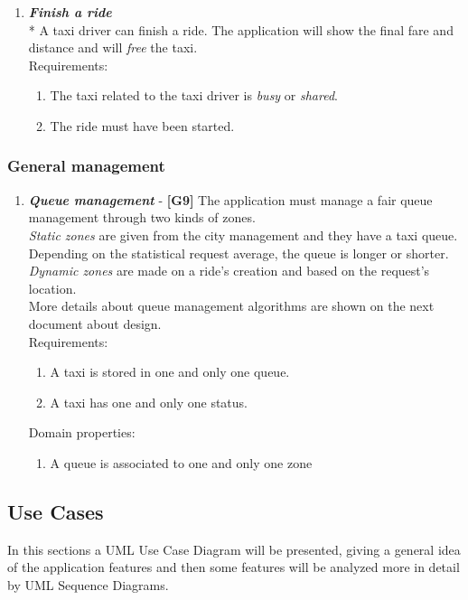\documentclass{article}
\begin{document}
\begin{enumerate}
\item \textit{\textbf{Finish a ride}}\\*
A taxi driver can finish a ride. The application will show the final fare and distance and will \textit{free} the taxi.\\
Requirements:
\begin{enumerate}
\item The taxi related to the taxi driver is \textit{busy} or \textit{shared}.
\item The ride must have been started.
\end{enumerate}

\end{enumerate}

\subsubsection{General management}
\begin{enumerate}
\item \textit{\textbf{Queue management}} - \textbf{[G9]}
The application must manage a fair queue management through two kinds
of zones.\\
\textit{Static zones} are given from the city management and they have a taxi queue. Depending on the statistical request average, the queue is longer or shorter.\\
\textit{Dynamic zones} are made on a ride’s creation and based on the request’s location.\\
More details about queue management algorithms are shown on the next
document about design.\\
Requirements:
\begin{enumerate}
\item A taxi is stored in one and only one queue.
\item A taxi has one and only one status.
\end{enumerate}
Domain properties:
\begin{enumerate}
\item A queue is associated to one and only one zone
\end{enumerate}
\end{enumerate}


\subsection{Use Cases}
In this sections a UML Use Case Diagram will be presented, giving a general idea of the application features and then some features will be analyzed more in detail by UML Sequence Diagrams.  
\end{document}
